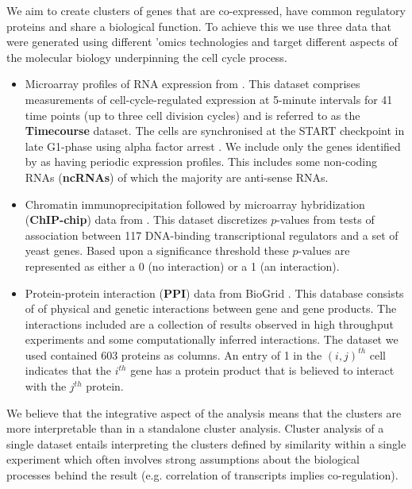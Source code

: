 \documentclass{bioinfo}
\begin{document}
We aim to create clusters of genes that are co-expressed, have common regulatory proteins and share a biological function. To achieve this we use three data that were generated using different 'omics technologies and target different aspects of the molecular biology underpinning the cell cycle process.
\begin{itemize}
	\item Microarray profiles of RNA expression from \cite{granovskaia2010high}. This dataset comprises measurements of cell-cycle-regulated expression at 5-minute intervals for 41 time points (up to three cell division cycles) and is referred to as the \textbf{Timecourse} dataset. The cells are synchronised at the START checkpoint in late G1-phase using alpha factor arrest \citep{granovskaia2010high}. We include only the genes identified by \cite{granovskaia2010high} as having periodic expression profiles. This includes some non-coding RNAs (\textbf{ncRNAs}) of which the majority are anti-sense RNAs.
	\item Chromatin immunoprecipitation followed by microarray hybridization (\textbf{ChIP-chip}) data from \cite{harbison2004transcriptional}. This dataset discretizes $p$-values from tests of association between 117 DNA-binding transcriptional regulators and a set of yeast genes. Based upon a significance threshold these $p$-values are represented as either a 0 (no interaction) or a 1 (an interaction).
	\item Protein-protein interaction (\textbf{PPI}) data from BioGrid \citep{stark2006biogrid}. This database consists of of physical and genetic interactions between gene and gene products. The interactions included are a collection of results observed in high throughput experiments and some computationally inferred interactions. The dataset we used contained 603 proteins as columns. An entry of 1  in the $(i, j)^{th}$ cell indicates that the $i^{th}$ gene has a protein product that is believed to interact with the $j^{th}$ protein.
\end{itemize}
We believe that the integrative aspect of the analysis means that the clusters are more interpretable than in a standalone cluster analysis. Cluster analysis of a single dataset entails interpreting the clusters defined by similarity within a single experiment which often involves strong assumptions about the biological processes behind the result (e.g. correlation of transcripts implies co-regulation).
\end{document}
